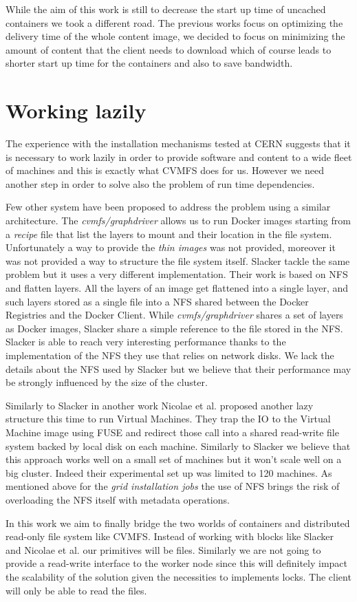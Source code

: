While the aim of this work is still to decrease the start up time of uncached
containers we took a different road. The previous works focus on optimizing
the delivery time of the whole content image, we decided to focus on minimizing
the amount of content that the client needs to download which of course leads to
shorter start up time for the containers and also to save bandwidth.

\section{Working lazily} \label{sec:soalazy}

The experience with the installation mechanisms tested at CERN suggests that it
is necessary to work lazily in order to provide software and content to a wide
fleet of machines and this is exactly what CVMFS does for us. However we need
another step in order to solve also the problem of run time dependencies.

Few other system have been proposed to address the problem using a similar
architecture. The \textit{cvmfs/graphdriver} \cite{graphdriver-plugin} allows
us to run Docker images starting from a \textit{recipe} file that  list the
layers to mount and their location in the file system. Unfortunately a way to
provide the \textit{thin images} was not provided, moreover it was not provided
a way to structure the file system itself. Slacker \cite{slacker} tackle the
same problem but it uses a very different implementation. Their work is based
on NFS and flatten layers. All the layers of an image get flattened into a
single layer, and such layers stored as a single file into a NFS shared between
the Docker Registries and the Docker Client. While \textit{cvmfs/graphdriver}
shares a set of layers as Docker images, Slacker share a simple reference to
the file stored in the NFS. Slacker is able to reach very interesting
performance thanks to the implementation of the NFS they use that relies on
network disks. We lack the details about the NFS used by Slacker but we believe
that their performance may be strongly influenced by the size of the cluster.

Similarly to Slacker in another work Nicolae et al. \cite{back-forth} proposed
another lazy structure this time to run Virtual Machines. They trap the IO to
the Virtual Machine image using FUSE and redirect those call into a shared
read-write file system backed by local disk on each machine.  Similarly to
Slacker we believe that this approach works well on a small set of machines but
it won't scale well on a big cluster. Indeed their experimental set up was
limited to 120 machines. As mentioned above for the \textit{grid installation
jobs} the use of NFS brings the risk of overloading the NFS itself with
metadata operations.

In this work we aim to finally bridge the two worlds of containers and
distributed read-only file system like CVMFS. Instead of working with blocks
like Slacker and Nicolae et al. our primitives will be files. Similarly we are
not going to provide a read-write interface to the worker node since this
will definitely impact the scalability of the solution given the necessities to
implements locks. The client will only be able to read the files.


